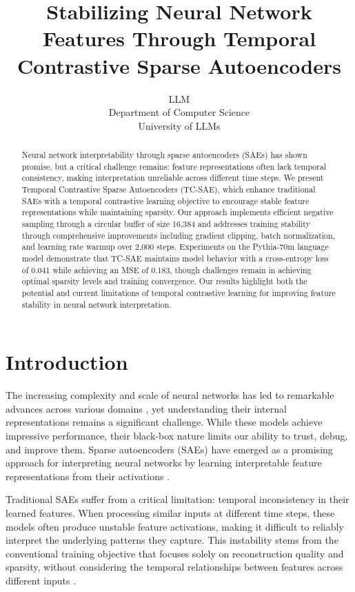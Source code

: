 \documentclass{article} %
\title{Stabilizing Neural Network Features Through Temporal Contrastive Sparse Autoencoders}
\author{LLM\\
Department of Computer Science\\
University of LLMs\\
}
\begin{document}
\maketitle

\begin{abstract}
Neural network interpretability through sparse autoencoders (SAEs) has shown promise, but a critical challenge remains: feature representations often lack temporal consistency, making interpretation unreliable across different time steps. We present Temporal Contrastive Sparse Autoencoders (TC-SAE), which enhance traditional SAEs with a temporal contrastive learning objective to encourage stable feature representations while maintaining sparsity. Our approach implements efficient negative sampling through a circular buffer of size 16,384 and addresses training stability through comprehensive improvements including gradient clipping, batch normalization, and learning rate warmup over 2,000 steps. Experiments on the Pythia-70m language model demonstrate that TC-SAE maintains model behavior with a cross-entropy loss of 0.041 while achieving an MSE of 0.183, though challenges remain in achieving optimal sparsity levels and training convergence. Our results highlight both the potential and current limitations of temporal contrastive learning for improving feature stability in neural network interpretation.
\end{abstract}

\section{Introduction}
\label{sec:intro}
The increasing complexity and scale of neural networks has led to remarkable advances across various domains \cite{goodfellow2016deep}, yet understanding their internal representations remains a significant challenge. While these models achieve impressive performance, their black-box nature limits our ability to trust, debug, and improve them. Sparse autoencoders (SAEs) have emerged as a promising approach for interpreting neural networks by learning interpretable feature representations from their activations \cite{radford2019language}.

Traditional SAEs suffer from a critical limitation: temporal inconsistency in their learned features. When processing similar inputs at different time steps, these models often produce unstable feature activations, making it difficult to reliably interpret the underlying patterns they capture. This instability stems from the conventional training objective that focuses solely on reconstruction quality and sparsity, without considering the temporal relationships between features across different inputs \cite{bahdanau2014neural}.
\end{document}
